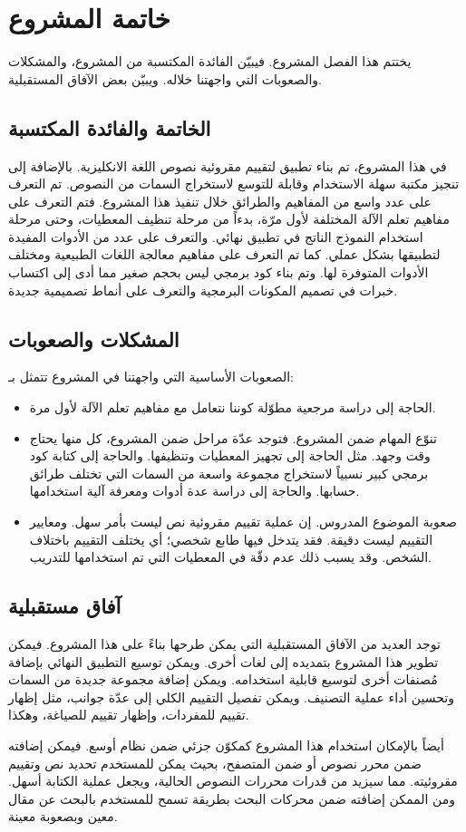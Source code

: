

\chapter{خاتمة المشروع}
يختتم هذا الفصل المشروع.
فيبيّن الفائدة المكتسبة من المشروع، والمشكلات والصعوبات التي واجهتنا خلاله.
ويبيّن بعض الآفاق المستقبلية.

\section{الخاتمة والفائدة المكتسبة}
في هذا المشروع، تم بناء تطبيق لتقييم مقروئية نصوص اللغة الانكليزية.
بالإضافة إلى تنجيز مكتبة سهلة الاستخدام وقابلة للتوسع لاستخراج السمات من النصوص.
تم التعرف على عدد واسع من المفاهيم والطرائق خلال تنفيذ هذا المشروع.
فتم التعرف على مفاهيم تعلم الآلة المختلفة لأول مرّة،
بدءاً من مرحلة تنظيف المعطيات، وحتى مرحلة استخدام النموذج الناتج في تطبيق نهائي.
والتعرف على عدد من الأدوات المفيدة لتطبيقها بشكل عملي.
كما تم التعرف على مفاهيم معالجة اللغات الطبيعية ومختلف الأدوات المتوفرة لها.
وتم بناء كود برمجي ليس بحجم صغير مما أدى إلى اكتساب خبرات في تصميم المكونات البرمجية والتعرف على أنماط تصميمية جديدة.



\section{المشكلات والصعوبات}
الصعوبات الأساسية التي واجهتنا في المشروع تتمثل بـ:
\begin{itemize}
	\item 
	الحاجة إلى دراسة مرجعية مطوّلة كوننا نتعامل مع مفاهيم تعلم الآلة لأول مرة.
	\item 
	تنوّع المهام ضمن المشروع.
	فتوجد عدّة مراحل ضمن المشروع، كل منها يحتاج وقت وجهد.
	مثل الحاجة إلى تجهيز المعطيات وتنظيفها.
	والحاجة إلى كتابة كود برمجي كبير نسبياً لاستخراج مجموعة واسعة من السمات التي تختلف طرائق حسابها.
	والحاجة إلى دراسة عدة أدوات ومعرفة آلية استخدامها.
	\item
	صعوبة الموضوع المدروس.
	إن عملية تقييم مقروئية نص ليست بأمر سهل. ومعايير التقييم ليست دقيقة.
	فقد يتدخل فيها طابع شخصي؛ أي يختلف التقييم باختلاف الشخص.
	وقد يسبب ذلك عدم دقّة في المعطيات التي تم استخدامها للتدريب.
\end{itemize}


\section{آفاق مستقبلية}
توجد العديد من الآفاق المستقبلية التي يمكن طرحها بناءً على هذا المشروع.
فيمكن تطوير هذا المشروع بتمديده إلى لغات أخرى.
ويمكن توسيع التطبيق النهائي بإضافة مُصنفات أخرى لتوسيع قابلية استخدامه.
ويمكن إضافة مجموعة جديدة من السمات وتحسين أداء عملية التصنيف.
ويمكن تفصيل التقييم الكلي إلى عدّة جوانب، مثل إظهار تقييم للمفردات، وإظهار تقييم للصياغة، وهكذا.

أيضاً بالإمكان استخدام هذا المشروع كمكوّن جزئي ضمن نظام أوسع.
فيمكن إضافته ضمن محرر نصوص أو ضمن المتصفح،
بحيث يمكن للمستخدم تحديد نص وتقييم مقروئيته.
مما سيزيد من قدرات محررات النصوص الحالية، ويجعل عملية الكتابة أسهل.
ومن الممكن إضافته ضمن محركات البحث بطريقة تسمح للمستخدم بالبحث عن مقال معين وبصعوبة معينة.






